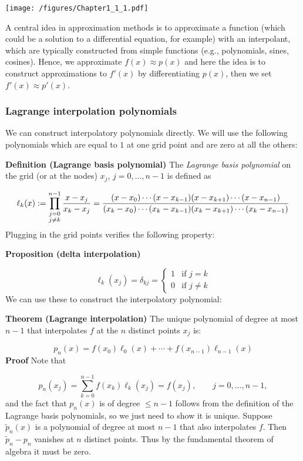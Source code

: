 \documentclass[12pt,landscape]{article}
\begin{document}
{\texttt{[image: /figures/Chapter1\_1\_1.pdf]}

A central idea in approximation methods is to approximate a function (which could be a solution to a differential equation, for example) with an interpolant, which are typically constructed from simple functions (e.g., polynomials, sines, cosines).  Hence, we approximate $f(x) \approx p(x)$ and here the idea is to  construct approximations to $f'(x)$ by differentiating $p(x)$, then we set $f'(x) \approx p'(x)$.

\subsubsection{Lagrange interpolation polynomials}
We can construct interpolatory polynomials directly. We will use the following polynomials which are equal to $1$ at one grid point and are zero at all the others:

\textbf{Definition (Lagrange basis polynomial)} The \emph{Lagrange basis polynomial} on the grid (or at the nodes)  $x_{j}$, $j = 0, \ldots, n-1$  is defined as

\[
\ensuremath{\ell}_k(x) := \prod_{\substack{j = 0 \\ j \neq k}}^{n-1} {x-x_j \over x_k - x_j} =  {(x-x_0) \ensuremath{\cdots}(x-x_{k-1})(x-x_{k+1}) \ensuremath{\cdots} (x-x_{n-1}) \over (x_k - x_0) \ensuremath{\cdots} (x_k - x_{k-1}) (x_k - x_{k+1}) \ensuremath{\cdots} (x_k - x_{n-1})}
\]
Plugging in the grid points verifies the following property:

\textbf{Proposition (delta interpolation)}

\[
\ensuremath{\ell}_k(x_j) = \ensuremath{\delta}_{kj} = \begin{cases}
1 & \text{if } j = k \\
0 & \text{if } j \neq k
\end{cases}
\]
We can use these to construct the interpolatory polynomial:

\textbf{Theorem (Lagrange interpolation)} The unique  polynomial of degree at most $n-1$ that interpolates $f$ at the $n$ distinct points $x_j$ is:

\[
p_n(x) = f(x_0) \ensuremath{\ell}_0(x) + \ensuremath{\cdots} + f(x_{n-1}) \ensuremath{\ell}_{n-1}(x)
\]
\textbf{Proof} Note that

\[
p_n(x_j) = \sum_{k=0}^{n-1} f(x_k) \ensuremath{\ell}_k(x_j) = f(x_j), \qquad j = 0, \ldots, n-1,
\]
and the fact that $p_n(x)$ is of degree $\leq n-1$ follows from the definition of the Lagrange basis polynomials, so we just need to show it is unique. Suppose $\tilde{p}_n(x)$ is a  polynomial of degree at most $n-1$ that also interpolates $f$. Then $\tilde{p}_n - p_n$ vanishes at $n$ distinct points. Thus by the fundamental theorem of algebra it must be zero.

}
\end{document}
